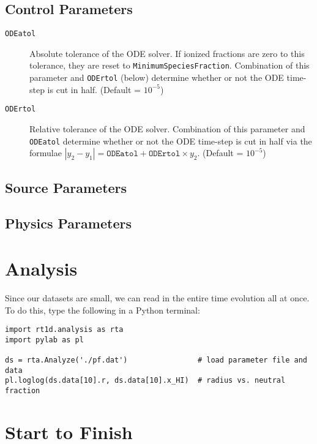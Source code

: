\documentclass[letterpaper,titlepage,12pt]{article}
\numberwithin{equation}{section}
\begin{document}
\subsection{Control Parameters}

\begin{description}
    
\item [\texttt{ODEatol}] Absolute tolerance of the ODE solver.  If ionized fractions are zero to this tolerance, they are reset to \texttt{MinimumSpeciesFraction}.  Combination of this parameter and \texttt{ODErtol} (below) determine whether or not the ODE time-step is cut in half. (Default = $10^{-5}$)

\item [\texttt{ODErtol}]
Relative tolerance of the ODE solver.  Combination of this parameter and \texttt{ODEatol} determine whether or not the ODE time-step is cut in half via the formulae $|y_2 - y_1| = \texttt{ODEatol} + \texttt{ODErtol}\times y_2$. (Default = $10^{-5}$)
 

\end{description}


\subsection{Source Parameters}


\subsection{Physics Parameters}


\section{Analysis}
Since our datasets are small, we can read in the entire time evolution all at once.  To do this, type the following in a Python terminal:
\begin{verbatim}
import rt1d.analysis as rta
import pylab as pl

ds = rta.Analyze('./pf.dat')                # load parameter file and data
pl.loglog(ds.data[10].r, ds.data[10].x_HI)  # radius vs. neutral fraction
\end{verbatim}

\section{Start to Finish}
\end{document}
